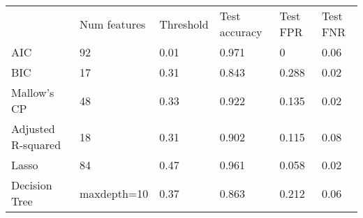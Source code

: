 \documentclass{article}
\begin{document}
\begin{table}[]
\begin{tabular}{llllll}
                   & Num features & Threshold & Test accuracy & Test FPR & Test FNR \\
AIC                & 92           & 0.01      & 0.971         & 0        & 0.06     \\
BIC                & 17           & 0.31      & 0.843         & 0.288    & 0.02     \\
Mallow's CP        & 48           & 0.33      & 0.922         & 0.135    & 0.02     \\
Adjusted R-squared & 18           & 0.31      & 0.902         & 0.115    & 0.08     \\
Lasso              & 84           & 0.47      & 0.961         & 0.058    & 0.02     \\
Decision Tree      & maxdepth=10  & 0.37      & 0.863         & 0.212    & 0.06
\end{tabular}
\end{table}
\end{document}
